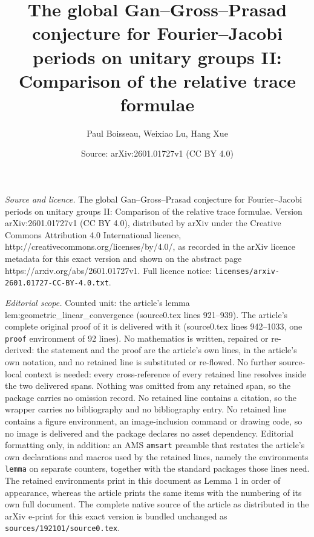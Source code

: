 \documentclass[10pt,a4paper]{amsart}
\title{The global Gan--Gross--Prasad conjecture for Fourier--Jacobi periods on unitary groups II: Comparison of the relative trace formulae}
\author{Paul Boisseau, Weixiao Lu, Hang Xue}
\date{Source: arXiv:2601.01727v1 (CC BY 4.0)}
\begin{document}
\maketitle

\noindent\emph{Source and licence.} The global Gan--Gross--Prasad conjecture for Fourier--Jacobi periods on unitary groups II: Comparison of the relative trace formulae. Version arXiv:2601.01727v1 (CC BY 4.0), distributed by arXiv under the Creative Commons Attribution 4.0 International licence, http://creativecommons.org/licenses/by/4.0/, as recorded in the arXiv licence metadata for this exact version and shown on the abstract page https://arxiv.org/abs/2601.01727v1. Full licence notice: \texttt{licenses/arxiv-2601.01727-CC-BY-4.0.txt}.\par\smallskip

\noindent\textit{Editorial scope.} Counted unit: the article's lemma lem:geometric\_linear\_convergence (source0.tex lines 921--939). The article's complete original proof of it is delivered with it (source0.tex lines 942--1033, one \texttt{proof} environment of 92 lines). No mathematics is written, repaired or re-derived: the statement and the proof are the article's own lines, in the article's own notation, and no retained line is substituted or re-flowed.  No further source-local context is needed: every cross-reference of every retained line resolves inside the two delivered spans.  Nothing was omitted from any retained span, so the package carries no omission record.  No retained line contains a citation, so the wrapper carries no bibliography and no bibliography entry.  No retained line contains a figure environment, an image-inclusion command or drawing code, so no image is delivered and the package declares no asset dependency.  Editorial formatting only, in addition: an AMS \texttt{amsart} preamble that restates the article's own declarations and macros used by the retained lines, namely the environments \texttt{lemma} on separate counters, together with the standard packages those lines need.  The retained environments print in this document as Lemma 1 in order of appearance, whereas the article prints the same items with the numbering of its own full document.  The complete native source of the article as distributed in the arXiv e-print for this exact version is bundled unchanged as \texttt{sources/192101/source0.tex}.
\end{document}
